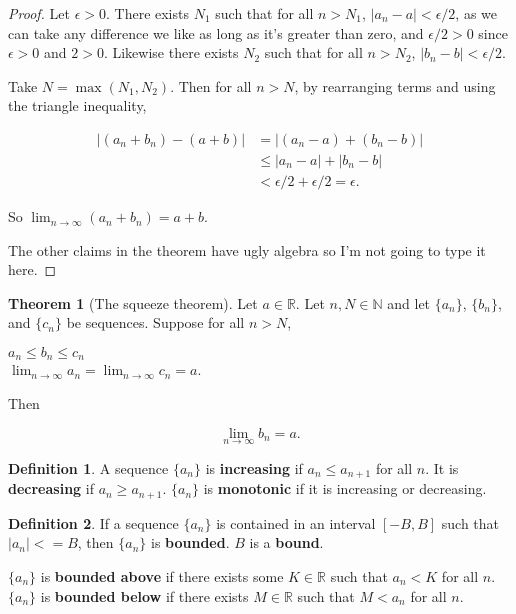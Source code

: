 \documentclass{article}
\theoremstyle{definition}
\newtheorem{definition}{Definition}[section]
\newtheorem{theorem}{Theorem}[section]
\begin{document}
\begin{proof}
Let $\epsilon > 0$. There exists $N_1$ such that for all $n > N_1$, $|a_n - a| < \epsilon/2$, as we can take any difference we like as long as it's greater than zero, and $\epsilon/2 > 0$ since $\epsilon > 0$ and $2 > 0$. Likewise there exists $N_2$ such that for all $n > N_2$, $|b_n - b| < \epsilon/2$.

Take $N = \max(N_1, N_2)$. Then for all $n > N$, by rearranging terms and using the triangle inequality,

\begin{align*}
|(a_n + b_n) - (a+b)| & =  |(a_n - a) + (b_n - b)| \\
& \leq  |a_n - a| + |b_n - b| \\
& <  \epsilon/2 + \epsilon/2 = \epsilon.
\end{align*}

So $\lim_{n \to \infty} (a_n + b_n) = a + b$.

The other claims in the theorem have ugly algebra so I'm not going to type it here.
\end{proof}

\begin{theorem}[The squeeze theorem] Let $a \in \mathbb{R}$. Let $n, N \in \mathbb{N}$ and let $\{a_n\}$, $\{b_n\}$, and $\{c_n\}$ be sequences. Suppose for all $n > N$,

\begin{center}
$a_n \leq b_n \leq c_n $\\
$\lim_{n \to \infty} a_n = \lim_{n \to \infty} c_n = a$.
\end{center}

Then

\begin{equation*}
\lim_{n \to \infty} b_n = a.
\end{equation*}

\end{theorem}

\begin{definition}
A sequence $\{a_n\}$ is \textbf{increasing} if $a_n \leq a_{n+1}$ for all $n$. It is \textbf{decreasing} if $a_n \geq a_{n+1}$. $\{a_n\}$ is \textbf{monotonic} if it is increasing or decreasing.
\end{definition}

\begin{definition}
If a sequence $\{a_n\}$ is contained in an interval $[-B, B]$ such that $|a_n| <= B$, then $\{a_n\}$ is \textbf{bounded}. $B$ is a \textbf{bound}.

$\{a_n\}$ is \textbf{bounded above} if there exists some $K \in \mathbb{R}$ such that $a_n < K$ for all $n$. $\{a_n\}$ is \textbf{bounded below} if there exists $M \in \mathbb{R}$ such that $M < a_n$ for all $n$.
\end{definition}
\end{document}
